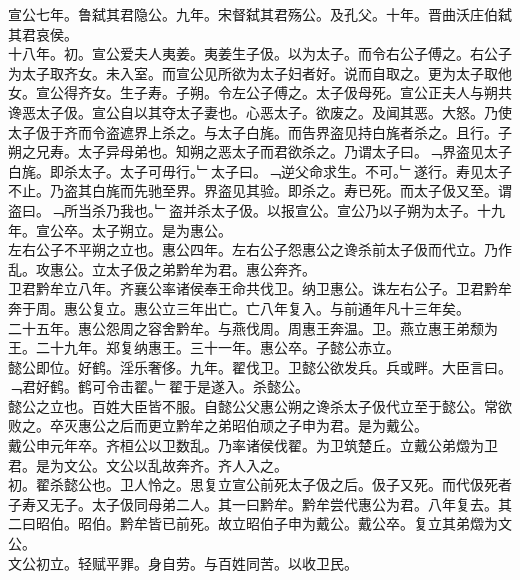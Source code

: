 \documentclass{zhvt-classic}
\begin{document}
\hspace*{2em}宣公七年。鲁弑其君隐公。九年。宋督弑其君殇公。及孔父。十年。晋曲沃庄伯弑其君哀侯。\\
\hspace*{2em}十八年。初。宣公爱夫人夷姜。夷姜生子伋。以为太子。而令右公子傅之。右公子为太子取齐女。未入室。而宣公见所欲为太子妇者好。说而自取之。更为太子取他女。宣公得齐女。生子寿。子朔。令左公子傅之。太子伋母死。宣公正夫人与朔共谗恶太子伋。宣公自以其夺太子妻也。心恶太子。欲废之。及闻其恶。大怒。乃使太子伋于齐而令盗遮界上杀之。与太子白旄。而告界盗见持白旄者杀之。且行。子朔之兄寿。太子异母弟也。知朔之恶太子而君欲杀之。乃谓太子曰。﹁界盗见太子白旄。即杀太子。太子可毋行。﹂太子曰。﹁逆父命求生。不可。﹂遂行。寿见太子不止。乃盗其白旄而先驰至界。界盗见其验。即杀之。寿已死。而太子伋又至。谓盗曰。﹁所当杀乃我也。﹂盗并杀太子伋。以报宣公。宣公乃以子朔为太子。十九年。宣公卒。太子朔立。是为惠公。\\
\hspace*{2em}左右公子不平朔之立也。惠公四年。左右公子怨惠公之谗杀前太子伋而代立。乃作乱。攻惠公。立太子伋之弟黔牟为君。惠公奔齐。\\
\hspace*{2em}卫君黔牟立八年。齐襄公率诸侯奉王命共伐卫。纳卫惠公。诛左右公子。卫君黔牟奔于周。惠公复立。惠公立三年出亡。亡八年复入。与前通年凡十三年矣。\\
\hspace*{2em}二十五年。惠公怨周之容舍黔牟。与燕伐周。周惠王奔温。卫。燕立惠王弟颓为王。二十九年。郑复纳惠王。三十一年。惠公卒。子懿公赤立。\\
\hspace*{2em}懿公即位。好鹤。淫乐奢侈。九年。翟伐卫。卫懿公欲发兵。兵或畔。大臣言曰。﹁君好鹤。鹤可令击翟。﹂翟于是遂入。杀懿公。\\
\hspace*{2em}懿公之立也。百姓大臣皆不服。自懿公父惠公朔之谗杀太子伋代立至于懿公。常欲败之。卒灭惠公之后而更立黔牟之弟昭伯顽之子申为君。是为戴公。\\
\hspace*{2em}戴公申元年卒。齐桓公以卫数乱。乃率诸侯伐翟。为卫筑楚丘。立戴公弟燬为卫君。是为文公。文公以乱故奔齐。齐人入之。\\
\hspace*{2em}初。翟杀懿公也。卫人怜之。思复立宣公前死太子伋之后。伋子又死。而代伋死者子寿又无子。太子伋同母弟二人。其一曰黔牟。黔牟尝代惠公为君。八年复去。其二曰昭伯。昭伯。黔牟皆已前死。故立昭伯子申为戴公。戴公卒。复立其弟燬为文公。\\
\hspace*{2em}文公初立。轻赋平罪。身自劳。与百姓同苦。以收卫民。\\
\end{document}
